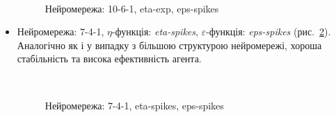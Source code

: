 \documentclass[a4paper,10pt,fleqn]{article}
\begin{document}
\begin{itemize}
\begin{figure}[h!]
  \centering
  \,
  \,
  \caption{Нейромережа: 10-6-1, eta-exp, eps-spikes}
  \label{fig:10-6-exp-spikes}
\end{figure}

\item Нейромережа: 7-4-1, $\eta$-функція: \textit{eta-spikes}, $\varepsilon$-функція: \textit{eps-spikes} (рис.~\ref{fig:7-4-spikes-spikes}). Аналогічно як і у випадку з більшою структурою нейромережі, хороша стабільність та висока ефективність агента.

\begin{figure}[h!]
  \centering
  \,
  \,
  \caption{Нейромережа: 7-4-1, eta-spikes, eps-spikes}
  \label{fig:7-4-spikes-spikes}
\end{figure}


\end{itemize}
\end{document}

